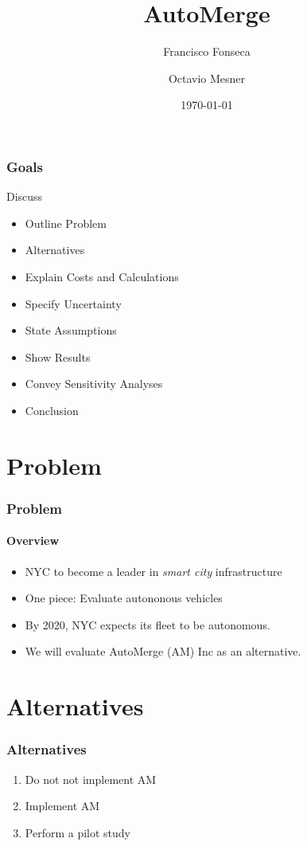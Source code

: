 \documentclass{beamer}
\title{AutoMerge}
\subtitle{}
\date{\today}
\author[Fonseca Mesner]{Francisco Fonseca \and Octavio Mesner}
\institute{Carnegie Mellon University}
\begin{document}
\maketitle

\section{}
\begin{frame}
\frametitle{Goals}
Discuss
\begin{itemize}
\item Outline Problem
\item Alternatives
\item Explain Costs and Calculations
\item Specify Uncertainty
\item State Assumptions
\item Show Results
\item Convey Sensitivity Analyses
\item Conclusion
\end{itemize}
\end{frame}

\section{Problem}

\begin{frame}
  \frametitle{Problem}
  \framesubtitle{Overview}
  \begin{itemize}
  \item NYC to become a leader in \emph{smart city} infrastructure
  \item One piece: Evaluate autononous vehicles
  \item By 2020, NYC expects its fleet to be autonomous.
  \item We will evaluate AutoMerge (AM) Inc as an alternative.
  \end{itemize}
\end{frame}

\section{Alternatives}
\begin{frame}
  \frametitle{Alternatives}
  \begin{enumerate}
  \item Do not not implement AM
  \item Implement AM
  \item Perform a pilot study
  \end{enumerate}
\end{frame}
\end{document}
